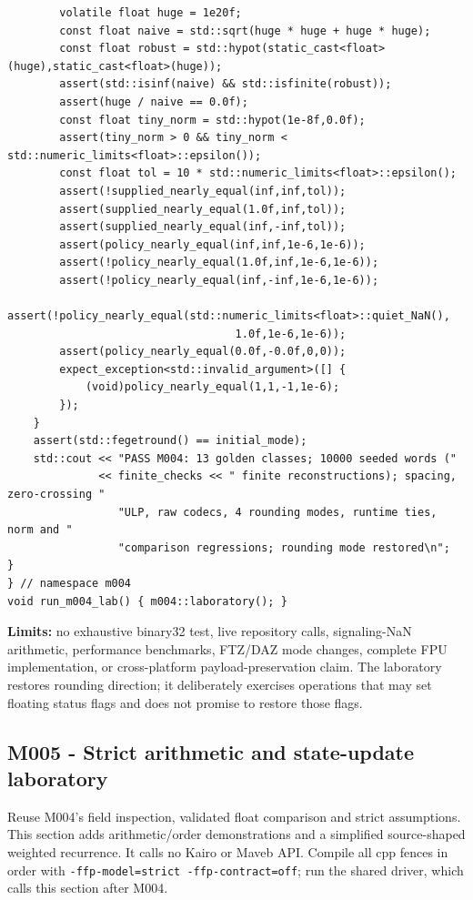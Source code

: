 \begin{verbatim}
        volatile float huge = 1e20f;
        const float naive = std::sqrt(huge * huge + huge * huge);
        const float robust = std::hypot(static_cast<float>(huge),static_cast<float>(huge));
        assert(std::isinf(naive) && std::isfinite(robust));
        assert(huge / naive == 0.0f);
        const float tiny_norm = std::hypot(1e-8f,0.0f);
        assert(tiny_norm > 0 && tiny_norm < std::numeric_limits<float>::epsilon());
        const float tol = 10 * std::numeric_limits<float>::epsilon();
        assert(!supplied_nearly_equal(inf,inf,tol));
        assert(supplied_nearly_equal(1.0f,inf,tol));
        assert(supplied_nearly_equal(inf,-inf,tol));
        assert(policy_nearly_equal(inf,inf,1e-6,1e-6));
        assert(!policy_nearly_equal(1.0f,inf,1e-6,1e-6));
        assert(!policy_nearly_equal(inf,-inf,1e-6,1e-6));
        assert(!policy_nearly_equal(std::numeric_limits<float>::quiet_NaN(),
                                   1.0f,1e-6,1e-6));
        assert(policy_nearly_equal(0.0f,-0.0f,0,0));
        expect_exception<std::invalid_argument>([] {
            (void)policy_nearly_equal(1,1,-1,1e-6);
        });
    }
    assert(std::fegetround() == initial_mode);
    std::cout << "PASS M004: 13 golden classes; 10000 seeded words ("
              << finite_checks << " finite reconstructions); spacing, zero-crossing "
                 "ULP, raw codecs, 4 rounding modes, runtime ties, norm and "
                 "comparison regressions; rounding mode restored\n";
}
} // namespace m004
void run_m004_lab() { m004::laboratory(); }
\end{verbatim}

\textbf{Limits:} no exhaustive binary32 test, live repository calls, signaling-NaN arithmetic, performance benchmarks, FTZ/DAZ mode changes, complete FPU implementation, or cross-platform payload-preservation claim. The laboratory restores rounding direction; it deliberately exercises operations that may set floating status flags and does not promise to restore those flags.

\subsection{M005 - Strict arithmetic and state-update laboratory}\label{appendix-4e2236f53445-m005---strict-arithmetic-and-state-update-laboratory}

\hypertarget{appendix-4e2236f53445-m005---strict-arithmetic-and-state-update-laboratory}{}

Reuse M004's field inspection, validated float comparison and strict assumptions. This section adds arithmetic/order demonstrations and a simplified source-shaped weighted recurrence. It calls no Kairo or Maveb API. Compile all cpp fences in order with \texttt{-ffp-model=strict\ -ffp-contract=off}; run the shared driver, which calls this section after M004.

